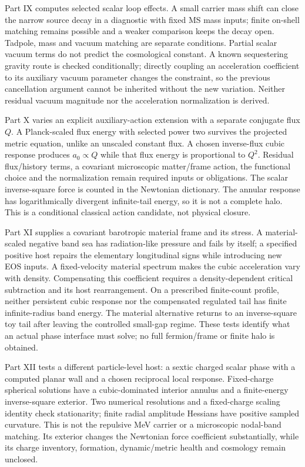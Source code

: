 \documentclass[11pt]{article}
\begin{document}
Part IX computes selected scalar loop effects. A small carrier mass shift
can close the narrow source decay in a diagnostic with fixed MS mass inputs;
finite on-shell matching remains possible and a weaker comparison keeps the
decay open. Tadpole, mass and vacuum matching are separate conditions.
Partial scalar vacuum terms do not predict the cosmological constant.
A known sequestering gravity route is checked conditionally; directly
coupling an acceleration coefficient to its auxiliary vacuum parameter
changes the constraint, so the previous cancellation argument cannot be
inherited without the new variation. Neither residual vacuum magnitude nor
the acceleration normalization is derived.

Part X varies an explicit auxiliary-action extension with a separate
conjugate flux $Q$. A Planck-scaled flux energy with selected power two
survives the projected metric equation, unlike an unscaled constant flux.
A chosen inverse-flux cubic response produces $a_0\propto Q$ while that
flux energy is proportional to $Q^2$. Residual flux/history terms, a
covariant microscopic matter/frame action, the functional choice and the
normalization remain required inputs or obligations. The scalar inverse-square
force is counted in the Newtonian dictionary. The annular response has
logarithmically divergent infinite-tail energy, so it is not a complete halo.
This is a conditional classical action candidate, not physical closure.

Part XI supplies a covariant barotropic material frame and its stress.
A material-scaled negative band sea has radiation-like pressure and fails
by itself; a specified positive host repairs the elementary longitudinal
signs while introducing new EOS inputs. A fixed-velocity material spectrum
makes the cubic acceleration vary with density. Compensating this coefficient
requires a density-dependent critical subtraction and its host rearrangement.
On a prescribed finite-count profile, neither persistent cubic response nor
the compensated regulated tail has finite infinite-radius band energy.
The material alternative returns to an inverse-square toy tail after leaving
the controlled small-gap regime. These tests identify what an actual phase
interface must solve; no full fermion/frame or finite halo is obtained.

Part XII tests a different particle-level host: a sextic charged scalar
phase with a computed planar wall and a chosen reciprocal local response.
Fixed-charge spherical solutions have a cubic-dominated interior annulus
and a finite-energy inverse-square exterior. Two numerical resolutions and
a fixed-charge scaling identity check stationarity; finite radial amplitude
Hessians have positive sampled curvature. This is not the repulsive MeV
carrier or a microscopic nodal-band matching. Its exterior changes the
Newtonian force coefficient substantially, while its charge inventory,
formation, dynamic/metric health and cosmology remain unclosed.
\end{document}
